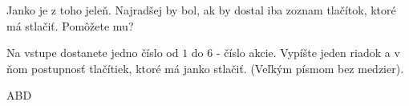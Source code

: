 
Janko je z toho jeleň. Najradšej by bol, ak by dostal iba zoznam tlačítok, ktoré má stlačiť. Pomôžete mu?

Na vstupe dostanete jedno číslo od $1$ do $6$ - číslo akcie. Vypíšte jeden riadok a v ňom postupnosť tlačítiek, ktoré má janko stlačiť. (Veľkým písmom bez medzier).

\vystup
ABD
\koniec


